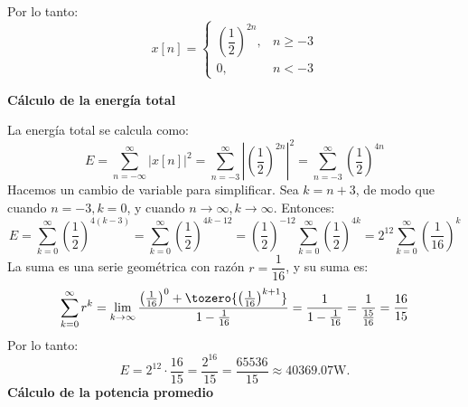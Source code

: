\begin{enumerate}[label=\color{red}\textbf{\arabic*)}]
\begin{enumerate}[label=Paso \arabic*:]
            Por lo tanto: \[
                x[n]=\begin{cases}
                    \left( \dfrac{1}{2} \right) ^{2n}, & n\ge -3\\
                    0, & n<-3
                \end{cases}
            \] 
            \begin{center}
            \end{center}
    \end{enumerate}
    \textbf{Cálculo de la energía total}

    La energía total se calcula como: \[
        E=\sum_{n=-\infty}^{\infty} |x[n]|^2=\sum_{n=-3}^{\infty} \left| \left( \dfrac{1}{2} \right) ^{2n} \right| ^2=\sum_{n=-3}^{\infty} \left( \dfrac{1}{2} \right) ^{4n}
    \] 
    Hacemos un cambio de variable para simplificar. Sea $k=n+3$, de modo que  cuando $n=-3,k=0$, y cuando  $n\to\infty, k\to \infty$. Entonces: \[
    E=\sum_{k=0}^{\infty} \left( \dfrac{1}{2} \right) ^{4(k-3)}=\sum_{k=0}^{\infty} \left( \dfrac{1}{2} \right) ^{4k-12}=\left( \dfrac{1}{2} \right) ^{-12}\sum_{k=0}^{\infty} \left( \dfrac{1}{2} \right) ^{4k}=2^{12}\sum_{k=0}^{\infty} \left( \dfrac{1}{16} \right) ^k
    \] 
    La suma es una serie geométrica con razón $r=\dfrac{1}{16}$, y su suma es: \[
        \sum_{k=0}^{\infty} r^k=\lim_{k \to \infty} \dfrac{\left( \frac{1}{16}  \right) ^0+\tozero{\left( \frac{1}{16}  \right) ^{k+1}} }{1-\frac{1}{16} }=\dfrac{1}{1-\frac{1}{16} }=\dfrac{1}{\frac{15}{16} }=\dfrac{16}{15}
    \] 
    Por lo tanto: \[
    E=2^{12}\cdot \dfrac{16}{15}=\dfrac{2^{16}}{15}=\dfrac{65536}{15}\approx 40369.07\mathrm{W}.
    \] 
    \textbf{Cálculo de la potencia promedio}


\end{enumerate}
